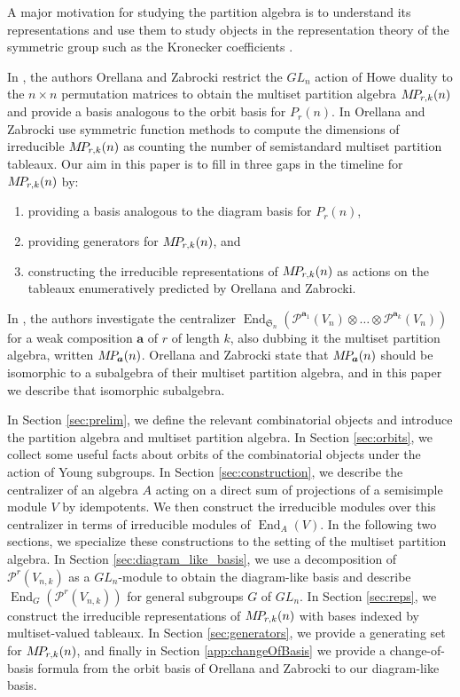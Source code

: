 \documentclass[10pt]{amsart}
\theoremstyle{definition}
\theoremstyle{definition}
\theoremstyle{plain}
\theoremstyle{remark}
\theoremstyle{plain}
\theoremstyle{plain}
\newcommand{\PP}{\mathcal{P}}
\newcommand{\SG}{\mathfrak{S}}
\newcommand{\bfa}{{\boldsymbol{a}}}
\newcommand{\MP}{{\rm M\!P\!}}
\DeclareMathOperator{\End}{End}
\begin{document}
A major motivation for studying the partition algebra is to understand its representations and use them to study objects in the representation theory of the symmetric group such as the Kronecker coefficients \cite{Benkart2019PartitionAA, Benkart2019PartitionAP, benkart2017dimensions,bowman2021the,enyang2013seminormal,halverson2001characters,halverson2004RSK,Halverson2019SetPartitionTS}. 

In \cite{orellana2020howe}, the authors Orellana and Zabrocki restrict the $GL_n$ action of Howe duality to the $n\times n$ permutation matrices to obtain the multiset partition algebra $\MP_{r,k}(n)$ and provide a basis analogous to the orbit basis for $P_r(n)$. In \cite{orellana2020combinatorial,orellana2020howe} Orellana and Zabrocki use symmetric function methods to compute the dimensions of irreducible $\MP_{r,k}(n)$ as counting the number of semistandard multiset partition tableaux. Our aim in this paper is to fill in three gaps in the timeline for $\MP_{r,k}(n)$ by:
\begin{enumerate}
    \item[(a)] providing a basis analogous to the diagram basis for $P_r(n)$,
    \item[(b)] providing generators for $\MP_{r,k}(n)$, and
    \item[(c)] constructing the irreducible representations of $\MP_{r,k}(n)$ as actions on the tableaux enumeratively predicted by Orellana and Zabrocki.
\end{enumerate}

In \cite{narayanan}, the authors investigate the centralizer $\End_{\SG_n}(\PP^{\bfa_1}(V_n)\otimes\dots\otimes \PP^{\bfa_k}(V_n))$ for a weak composition $\bfa$ of $r$ of length $k$, also dubbing it the multiset partition algebra, written $\MP_\bfa(n)$. Orellana and Zabrocki state that $\MP_\bfa(n)$ should be isomorphic to a subalgebra of their multiset partition algebra, and in this paper we describe that isomorphic subalgebra.

In Section \ref{sec:prelim}, we define the relevant combinatorial objects and introduce the partition algebra and multiset partition algebra. In Section \ref{sec:orbits}, we collect some useful facts about orbits of the combinatorial objects under the action of Young subgroups. In Section \ref{sec:construction}, we describe the centralizer of an algebra $A$ acting on a direct sum of projections of a semisimple module $V$ by idempotents. We then construct the irreducible modules over this centralizer in terms of irreducible modules of $\End_A(V)$. In the following two sections, we specialize these constructions to the setting of the multiset partition algebra. In Section \ref{sec:diagram_like_basis}, we use a decomposition of $\PP^r(V_{n,k})$ as a $GL_n$-module to obtain the diagram-like basis and describe $\End_G(\PP^r(V_{n,k}))$ for general subgroups $G$ of $GL_n$. In Section \ref{sec:reps}, we construct the irreducible representations of $\MP_{r,k}(n)$ with bases indexed by multiset-valued tableaux. In Section \ref{sec:generators}, we provide a generating set for $\MP_{r,k}(n)$, and finally in Section \ref{app:changeOfBasis} we provide a change-of-basis formula from the orbit basis of Orellana and Zabrocki to our diagram-like basis.
\end{document}
